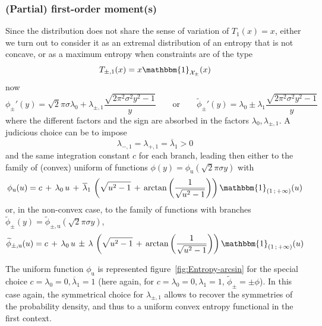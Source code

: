 \documentclass[english,sort&compress]{elsarticle}
\theoremstyle{definition}
\theoremstyle{plain}
\theoremstyle{plain}
\def\X{\mathcal{X}}
\def\un{\mathbbm{1}}
\begin{document}

\subsubsection{(Partial) first-order moment(s)}

Since the  distribution does not share the  sense of variation of  $T_1(x) = x$,
either we turn out to consider it as an extremal distribution of an entropy that
is not concave, or as a maximum entropy when constraints are of the type
%
\[
T_{\pm,1}(x) = x \un_{\X_\pm}(x)
\]
%
now 
%
\[
\phi_\pm'(y) = \sqrt2 \pi \sigma \lambda_0 + \lambda_{\pm,1} \frac{\sqrt{2 \pi^2
    \sigma^2  y^2 -  1}}{y} \qquad  \mbox{or} \qquad  \widetilde{\phi}_\pm'(y) =
\lambda_0 \pm \lambda_1 \frac{\sqrt{2 \pi^2 \sigma^2 y^2 - 1}}{y}
\]
%
where  the  different  factors  and  the  sign  are  absorbed  in  the  factors
$\lambda_0, \lambda_{\pm,1}$. A judicious choice can be to impose
%
\[
\lambda_{-,1} = \lambda_{+,1} = \overline{\lambda}_1 > 0
\]
%
and the  same integration constant $c$  for each branch, leading  then either to
the family of (convex)  uniform of functions $\phi(y) = \phi_{\mathrm{u}}(\sqrt2
\pi \sigma y)$ with
%
\[
\phi_{\mathrm{u}}(u) = c \, + \,  \lambda_0 \, u \, + \, \overline{\lambda}_1 \,
\left( \sqrt{u^2  - 1}  \, + \,  \arctan\left( \frac{1}{\sqrt{u^2 -  1}} \right)
\right) \un_{\left( 1 \, ; \, +\infty \right)}(u)
\]
%
or,  in  the  non-convex  case,   to  the  family  of  functions  with  branches
$\widetilde{\phi}_{\pm}(y) = \widetilde{\phi}_{\pm,\mathrm{u}}(\sqrt2 \pi \sigma
y)$,
%
\[
\widetilde{\phi}_{\pm,\mathrm{u}}(u) = c \, + \, \lambda_0 \, u \, \pm \, \lambda \, \left(
  \sqrt{u^2 - 1} \, +  \, \arctan\left( \frac{1}{\sqrt{u^2 - 1}} \right) \right)
\un_{\left( 1 \, ; \, +\infty \right)}(u)
\]


The      uniform      function      $\phi_{\mathrm{u}}$      is      represented
figure~\ref{fig:Entropy-arcsin}  for the  special  choice $c  =  \lambda_0 =  0,
\overline{\lambda}_1 = 1$  (here again, for $c = \lambda_0 =  0, \lambda_1 = 1$,
$\widetilde{\phi}_\pm = \pm \phi$).  In  this case again, the symmetrical choice
for  $\lambda_{\pm,1}$  allows to  recover  the  symmetries  of the  probability
density, and thus to a uniform convex entropy functional in the first context.

\
 
\end{document}

